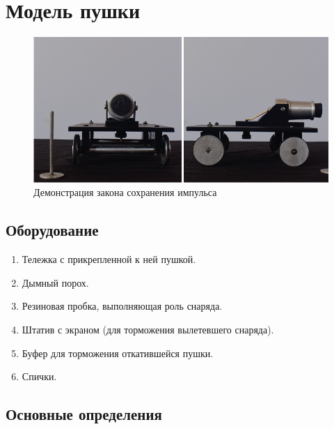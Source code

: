 \documentclass[All.tex]{subfiles}
\begin{document}


	\section{Модель пушки}


\begin{figure}[H] 
	\centering 	
	\includegraphics[width=1\linewidth]{cannon-1.png}
	\caption{Демонстрация  закона сохранения импульса}
	\label{cannon-1}
\end{figure}


\subsection*{\textcolor{PineGreen}{Оборудование}}

\begin{enumerate}
	\item Тележка с прикрепленной к ней пушкой.
	\item Дымный порох.
	\item Резиновая пробка, выполняющая роль снаряда.
	\item Штатив с экраном (для торможения вылетевшего снаряда).
	\item Буфер для торможения откатившейся пушки.
	\item Спички.
\end{enumerate}

\subsection*{\textcolor{PineGreen}{Основные определения}}
\end{document}
